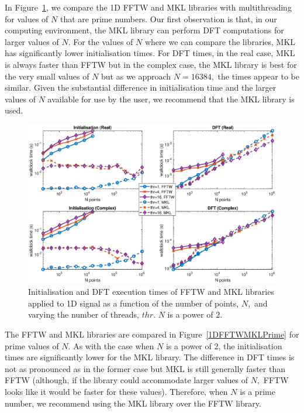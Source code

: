 \documentclass[a4paper]{article}
\begin{document}
In Figure~\ref{1DFFTWMKL2}, we compare the 1D FFTW and MKL libraries
with multithreading for values of $N$ that are prime numbers. Our
first observation is that, in our computing environment, the MKL
library can perform DFT computations for larger values of $N.$ For the
values of $N$ where we can compare the libraries, MKL has
significantly lower initialisation times. For DFT times, in the real
case, MKL is always faster than FFTW but in the complex case, the MKL
library is best for the very small values of $N$ but as we approach
$N=16384,$ the times appear to be similar. Given the substantial
difference in initialisation time and the larger values of $N$
available for use by the user, we recommend that the MKL library is
used.



\begin{figure}[htb]
    \centering
    \includegraphics[width=\linewidth]{../results/fftw_mkl_2_1d_thr.eps}
  \caption{Initialisation and DFT execution times of FFTW and MKL libraries applied to 1D signal as a function of the
    number of points, $N,$ and varying the number of threads, $thr.$ $N$ is a power of 2.}
  \label{1DFFTWMKL2}
\end{figure}



The FFTW and MKL libraries are compared in Figure~\ref{1DFFTWMKLPrime}
for prime values of $N.$ As with the case when $N$ is a power of 2,
the initialisation times are significantly lower for the MKL
library. The difference in DFT times is not as pronounced as in the
former case but MKL is still generally faster than FFTW (although, if
the library could accommodate larger values of $N,$ FFTW looks like it
would be faster for these values). Therefore, when $N$ is a prime
number, we recommend using the MKL library over the FFTW library.
\end{document}
